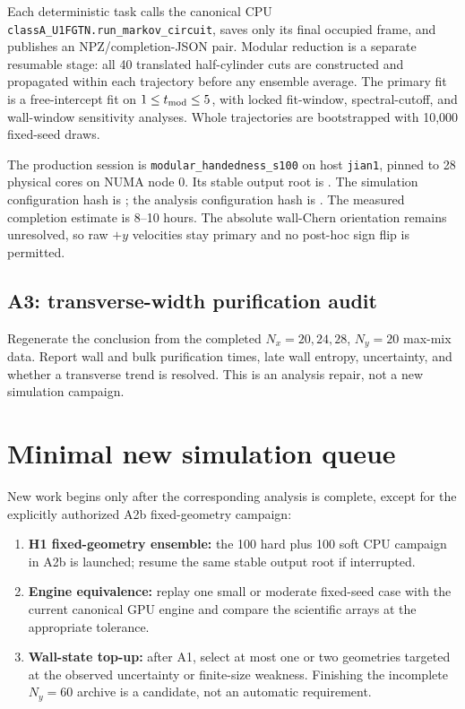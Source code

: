 \documentclass[aps,prx,twocolumn,floatfix,nofootinbib,superscriptaddress]{revtex4-2}
\newcommand{\code}[1]{\texttt{#1}}
\newcommand{\status}[1]{\textbf{#1}}
\begin{document}
Each deterministic task calls the canonical CPU
\code{classA\_U1FGTN.run\_markov\_circuit}, saves only its final occupied
frame, and publishes an NPZ/completion-JSON pair.  Modular reduction is a
separate resumable stage: all 40 translated half-cylinder cuts are constructed
and propagated within each trajectory before any ensemble average.  The
primary fit is a free-intercept fit on $1\le t_{\rm mod}\le5$, with locked
fit-window, spectral-cutoff, and wall-window sensitivity analyses.  Whole
trajectories are bootstrapped with 10,000 fixed-seed draws.

The production session is \code{modular\_handedness\_s100} on host
\code{jian1}, pinned to 28 physical cores on NUMA node 0.  Its stable output
root is
.
The simulation configuration hash is
;
the analysis configuration hash is
.
The measured completion estimate is 8--10 hours.  The absolute wall-Chern
orientation remains unresolved, so raw $+y$ velocities stay primary and no
post-hoc sign flip is permitted.

\subsection{A3: transverse-width purification audit}

Regenerate the conclusion from the completed $N_x=20,24,28$, $N_y=20$ max-mix
data.  Report wall and bulk purification times, late wall entropy, uncertainty,
and whether a transverse trend is resolved.  This is an analysis repair, not a
new simulation campaign.

\section{Minimal new simulation queue}

New work begins only after the corresponding analysis is complete, except for
the explicitly authorized A2b fixed-geometry campaign:
\begin{enumerate}
\item \status{H1 fixed-geometry ensemble:} the 100 hard plus 100 soft CPU
campaign in A2b is launched; resume the same stable output root if interrupted.
\item \status{Engine equivalence:} replay one small or moderate fixed-seed case
with the current canonical GPU engine and compare the scientific arrays at the
appropriate tolerance.
\item \status{Wall-state top-up:} after A1, select at most one or two geometries
targeted at the observed uncertainty or finite-size weakness.  Finishing the
incomplete $N_y=60$ archive is a candidate, not an automatic requirement.
\end{enumerate}
\end{document}
